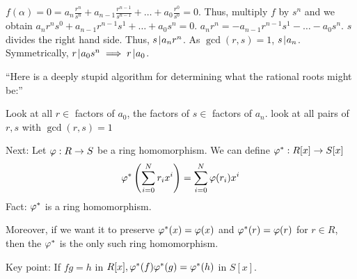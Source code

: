 \documentclass[notes.tex]{subfiles}
\begin{document}
$f(\alpha) = 0 = a_n\frac{r^n}{s^n} + a_{n-1}\frac{r^{n-1}}{s^{n-1}} + \ldots + a_0\frac{r^0}{s^0} = 0$. Thus, multiply $f$ by $s^n$ and we obtain $a_nr^ns^0 + a_{n-1}r^{n-1}s^1 + \ldots + a_0s^n = 0$.
$a_nr^n = -a_{n-1}r^{n-1}s^1 - \ldots - a_0 s^n$. $s$ divides the right hand side. Thus, $s \mkern2mu|\mkern1mu a_nr^n$. As $\gcd(r, s) = 1$, $s\mkern2mu|\mkern1mu a_n$.
Symmetrically, $r\mkern2mu|\mkern1mu a_0s^n \implies r\mkern2mu|\mkern1mu a_0$. 

``Here is a deeply stupid algorithm for determining what the rational roots might be:''

Look at all $r\in$ factors of $a_0$, the factors of $s\in$ factors of $a_n$. look at all pairs of $r, s$ with $\gcd(r, s) = 1$

Next: Let $\varphi:R\to S$ be a ring homomorphism. We can define $\varphi^*:R[x]\to S[x]$ 
\[
	\varphi^*\left(\sum_{i=0}^Nr_ix^i\right) = \sum_{i=0}^N\varphi(r_i)x^i
\]
Fact: $\varphi^*$ is a ring homomorphism.

Moreover, if we want it to preserve $\varphi^*(x) = \varphi(x)$  and $\varphi^*(r) = \varphi(r)$ for $r\in R$, then the $\varphi^*$ is the only such ring homomorphism.

Key point: If $fg = h$ in $R[x], \varphi^*(f)\varphi^*(g) = \varphi^*(h)$ in $S[x]$.
\end{document}
